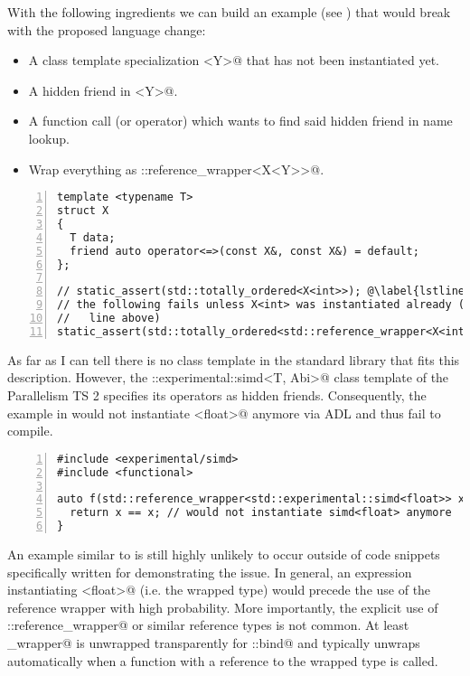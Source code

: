 With the following ingredients we can build an example (see ) that 
would break with the proposed language change:
\begin{itemize}
\item A class template specialization \codelst@X<Y>@ that has not been instantiated yet.
\item A hidden friend in \codelst@X<Y>@.
\item A function call (or operator) which wants to find said hidden friend in name lookup.
\item Wrap everything as \codelst@std::reference_wrapper<X<Y>>@.
\end{itemize}
\begin{lstlisting}[numbers=left,float={hbtp},label=lst:refwrapperproblem,caption={
\code{std::reference_wrapper} example which would fail unless 
line~\ref{lstline:refwrapperproblem0} is uncommented
}]
template <typename T>
struct X
{
  T data;
  friend auto operator<=>(const X&, const X&) = default;
};

// static_assert(std::totally_ordered<X<int>>); @\label{lstline:refwrapperproblem0}@
// the following fails unless X<int> was instantiated already (e.g. with the
//   line above)
static_assert(std::totally_ordered<std::reference_wrapper<X<int>>>);
\end{lstlisting}

As far as I can tell there is no class template in the standard library that fits this 
description. However, the \codelst@std::experimental::simd<T, Abi>@ class template of the 
Parallelism TS 2 specifies its operators as hidden friends. Consequently, the example in 
 would not instantiate \codelst@simd<float>@ anymore via ADL and thus 
fail to compile.
\begin{lstlisting}[numbers=left,float={hbtp},label=lst:refwrappersimd,caption={
Regression when combining \code{std::reference_wrapper} with 
\code{std::experimental::simd}.
}]
#include <experimental/simd>
#include <functional>

auto f(std::reference_wrapper<std::experimental::simd<float>> x) {
  return x == x; // would not instantiate simd<float> anymore
}
\end{lstlisting}

An example similar to  is still highly unlikely to occur outside of 
code snippets specifically written for demonstrating the issue. In general, an expression 
instantiating \codelst@simd<float>@ (i.e. the wrapped type) would precede the use of the 
reference wrapper with high probability.
More importantly, the explicit use of \codelst@std::reference_wrapper@ or similar 
reference types is not common. At least \codelst@reference_wrapper@ is unwrapped 
transparently for \codelst@std::bind@ and typically unwraps automatically when a function 
with a reference to the wrapped type is called.

